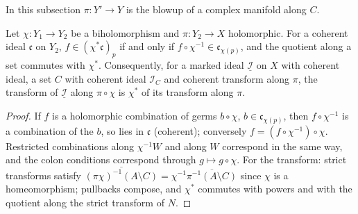 In this subsection \(\pi\colon Y'\to Y\) is the blowup of a complex manifold along \(C\).

\begin{lemma}
\label{mc:transform-source-naturality}
\leanok
Let \(\chi\colon Y_1\to Y_2\) be a biholomorphism and \(\pi\colon Y_2\to X\) holomorphic. For a coherent ideal \(\mathfrak c\) on \(Y_2\),
\(f\in(\chi^*\mathfrak c)_p\) if and only if \(f\circ\chi^{-1}\in\mathfrak c_{\chi(p)}\), and the quotient along a set commutes with \(\chi^*\). Consequently,
for a marked ideal \(\underline{\mathcal I}\) on \(X\) with coherent ideal, a set \(C\) with coherent ideal \(\mathcal I_C\) and coherent transform along
\(\pi\), the transform of \(\underline{\mathcal I}\) along \(\pi\circ\chi\) is \(\chi^*\) of its transform along \(\pi\).
\end{lemma}
\begin{proof}
\leanok
If \(f\) is a holomorphic combination of germs \(b\circ\chi\), \(b\in\mathfrak c_{\chi(p)}\), then \(f\circ\chi^{-1}\) is a combination of the \(b\), so lies in
\(\mathfrak c\) (coherent); conversely \(f=(f\circ\chi^{-1})\circ\chi\). Restricted combinations along \(\chi^{-1}W\) and along \(W\) correspond in the same way,
and the colon conditions correspond through \(g\mapsto g\circ\chi\). For the transform: strict transforms satisfy
\(\overline{(\pi\chi)^{-1}(A\setminus C)}=\chi^{-1}\overline{\pi^{-1}(A\setminus C)}\) since \(\chi\) is a homeomorphism; pullbacks compose, and
\(\chi^*\) commutes with powers and with the quotient along the strict transform of \(N\).
\end{proof}

